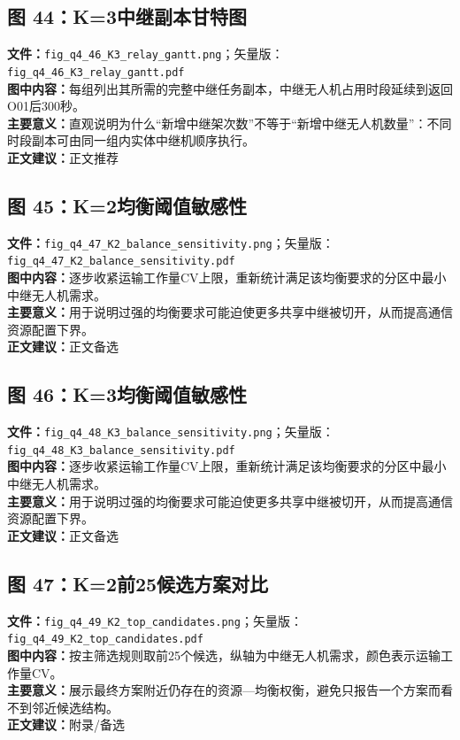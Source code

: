 \subsection*{图 44：K=3中继副本甘特图}
\textbf{文件：}\texttt{fig\_q4\_46\_K3\_relay\_gantt.png}；矢量版：\texttt{fig\_q4\_46\_K3\_relay\_gantt.pdf}\\
\textbf{图中内容：}每组列出其所需的完整中继任务副本，中继无人机占用时段延续到返回O01后300秒。\\
\textbf{主要意义：}直观说明为什么“新增中继架次数”不等于“新增中继无人机数量”：不同时段副本可由同一组内实体中继机顺序执行。\\
\textbf{正文建议：}正文推荐

\subsection*{图 45：K=2均衡阈值敏感性}
\textbf{文件：}\texttt{fig\_q4\_47\_K2\_balance\_sensitivity.png}；矢量版：\texttt{fig\_q4\_47\_K2\_balance\_sensitivity.pdf}\\
\textbf{图中内容：}逐步收紧运输工作量CV上限，重新统计满足该均衡要求的分区中最小中继无人机需求。\\
\textbf{主要意义：}用于说明过强的均衡要求可能迫使更多共享中继被切开，从而提高通信资源配置下界。\\
\textbf{正文建议：}正文备选

\subsection*{图 46：K=3均衡阈值敏感性}
\textbf{文件：}\texttt{fig\_q4\_48\_K3\_balance\_sensitivity.png}；矢量版：\texttt{fig\_q4\_48\_K3\_balance\_sensitivity.pdf}\\
\textbf{图中内容：}逐步收紧运输工作量CV上限，重新统计满足该均衡要求的分区中最小中继无人机需求。\\
\textbf{主要意义：}用于说明过强的均衡要求可能迫使更多共享中继被切开，从而提高通信资源配置下界。\\
\textbf{正文建议：}正文备选

\subsection*{图 47：K=2前25候选方案对比}
\textbf{文件：}\texttt{fig\_q4\_49\_K2\_top\_candidates.png}；矢量版：\texttt{fig\_q4\_49\_K2\_top\_candidates.pdf}\\
\textbf{图中内容：}按主筛选规则取前25个候选，纵轴为中继无人机需求，颜色表示运输工作量CV。\\
\textbf{主要意义：}展示最终方案附近仍存在的资源—均衡权衡，避免只报告一个方案而看不到邻近候选结构。\\
\textbf{正文建议：}附录/备选

